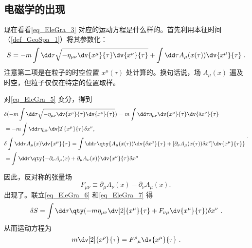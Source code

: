 \subsection{电磁学的出现}

现在看看\autoref{eq_EleGra_3} 对应的运动方程是什么样的。首先利用本征时间（\autoref{def_GeoSpa_1}）将其参数化：
\begin{equation}\label{eq_EleGra_5}
S=-m\int\dd \tau\sqrt{-\eta_{\mu\nu}\dv{x^\mu}{\tau}\dv{x^\nu}{\tau}}+\int\dd \tau A_\mu(x(\tau))\dv{x^\mu}{\tau}~.
\end{equation}
注意第二项是在粒子的时空位置 $x^\mu(\tau)$ 处计算的。换句话说，场 $A_\mu(x)$ 遍及时空，但粒子仅仅在特定的位置取样。

对\autoref{eq_EleGra_5} 变分，得到
\begin{equation}\label{eq_EleGra_6}
\begin{aligned}
&\delta(-m\int\dd \tau\sqrt{-\eta_{\mu\nu}\dv{x^\mu}{\tau}\dv{x^\nu}{\tau}})=m\int\dd \tau\eta_{\mu\nu}\dv{x^\mu}{\tau}\dv{\delta x^\nu}{\tau}\\
&=-m\int\dd \tau\eta_{\mu\nu}\dv[2]{x^\mu}{\tau}\delta x^\nu,\\
&\delta\int\dd \tau A_\mu(x)\dv{x^\mu}{\tau}=\int\dd \tau \qty{A_\mu(x(\tau))\dv{\delta x^\mu}{\tau}+[\partial_\nu A_\mu(x(\tau))\delta x^\nu]\dv{ x^\mu}{\tau}}\\
&=\int\dd \tau \qty{-\partial_\nu A_\mu(x)+\partial_\mu A_\nu(x)}\dv{x^\nu}{\tau}\delta x^\mu\\
\end{aligned}~.
\end{equation}

因此，反对称的张量场
\begin{equation}\label{eq_EleGra_7}
F_{\mu\nu}\equiv\partial_\mu A_\nu(x)-\partial_\nu A_\mu(x).~
\end{equation}
出现了。联立\autoref{eq_EleGra_6} 和\autoref{eq_EleGra_7} 得
\begin{equation}
\delta S=\int\dd\tau \qty(-m\eta_{\mu\nu}\dv[2]{x^\mu}{\tau}+F_{\nu\mu}\dv{x^\mu}{\tau})\delta x^\nu~.
\end{equation}
从而运动方程为
\begin{equation}
m\dv[2]{x^\rho}{\tau}={F^\rho}_{\mu}\dv{x^\mu}{\tau}~.
\end{equation}

